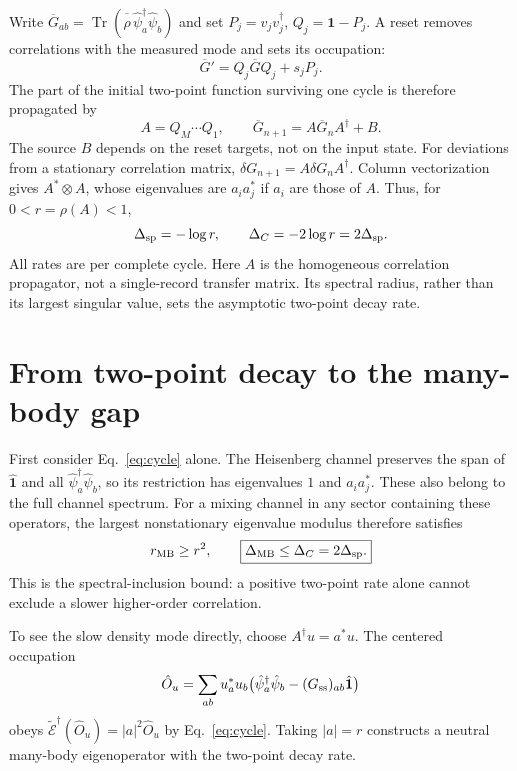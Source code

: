 \documentclass[aps,prb,twocolumn,10pt,raggedbottom,nofootinbib,superscriptaddress]{revtex4-2}
\newcommand{\Id}{\hat{\mathbf{1}}}
\newcommand{\id}{\mathbf{1}}
\newcommand{\Tr}{\operatorname{Tr}}
\newcommand{\E}{\widetilde{\mathcal E}}
\begin{document}
Write $\overline G_{ab}=\Tr(\overline{\hat\rho}\,
\hat\psi_a^\dagger\hat\psi_b)$ and set
$P_j=v_jv_j^\dagger$, $Q_j=\id-P_j$. A reset removes correlations
with the measured mode and sets its occupation:
\begin{equation}
 \overline G'=Q_j\overline GQ_j+s_jP_j. \label{eq:localG}
\end{equation}
The part of the initial two-point function surviving one cycle is
therefore propagated by
\begin{equation}
 A=Q_M\cdots Q_1,\qquad
 \overline G_{n+1}=A\overline G_nA^\dagger+B. \label{eq:cycle}
\end{equation}
The source $B$ depends on the reset targets, not on the input state.
For deviations from a stationary correlation matrix,
$\delta G_{n+1}=A\delta G_nA^\dagger$. Column vectorization gives
$A^*\otimes A$, whose eigenvalues are $a_i a_j^*$ if $a_i$ are those
of $A$. Thus, for $0<r=\rho(A)<1$,
\begin{equation}
 \Delta_{\rm sp}=-\log r,\qquad
 \Delta_C=-2\log r=2\Delta_{\rm sp}. \label{eq:rate}
\end{equation}
All rates are per complete cycle. Here $A$ is the homogeneous
correlation propagator, not a single-record transfer matrix. Its
spectral radius, rather than its largest singular value, sets the
asymptotic two-point decay rate.

\section{From two-point decay to the many-body gap}
First consider Eq.~\eqref{eq:cycle} alone. The Heisenberg channel
preserves the span of $\Id$ and all
$\hat\psi_a^\dagger\hat\psi_b$, so its restriction has eigenvalues
$1$ and $a_i a_j^*$. These also belong to the full channel spectrum.
For a mixing channel in any sector containing these operators, the
largest nonstationary eigenvalue modulus therefore satisfies
\begin{equation}
 r_{\rm MB}\ge r^2,\qquad
 \boxed{\Delta_{\rm MB}\le\Delta_C=2\Delta_{\rm sp}.}
 \label{eq:bound}
\end{equation}
This is the spectral-inclusion bound: a positive two-point rate alone
cannot exclude a slower higher-order correlation.

To see the slow density mode directly, choose $A^\dagger u=a^*u$.
The centered occupation
\begin{equation}
 \hat O_u=\sum_{ab}u_a^*u_b
 \bigl(\hat\psi_a^\dagger\hat\psi_b-(G_{\rm ss})_{ab}\Id\bigr)
 \label{eq:densitymode}
\end{equation}
obeys $\E^\dagger(\hat O_u)=|a|^2\hat O_u$ by
Eq.~\eqref{eq:cycle}. Taking $|a|=r$ constructs a neutral many-body
eigenoperator with the two-point decay rate.
\end{document}
